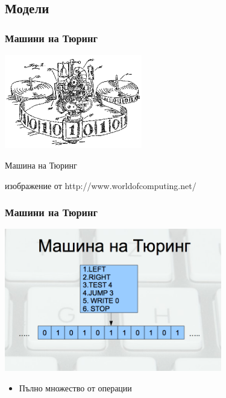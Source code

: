 \documentclass{beamer}
\begin{document}
\subsection{Модели}


\begin{frame}[fragile]
\frametitle{Машини на Тюринг}


\begin{center}
\includegraphics[width=6cm]{images/turingmachine}
\end{center}
\begin{center}
   Машина на Тюринг

   изображение от http://www.worldofcomputing.net/
\end{center}

\end{frame}


\begin{frame}[fragile]
\frametitle{Машини на Тюринг}


\begin{center}

\includegraphics[width=9.5cm]{images/turing}

\begin{itemize}
  \item Пълно множество от операции
\end{itemize}

\end{center}

\end{frame}
\end{document}
